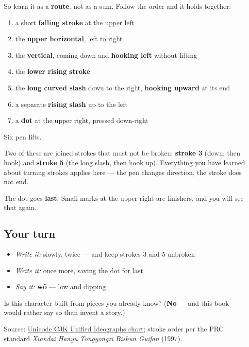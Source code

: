 So learn it as a \textbf{route}, not as a sum. Follow the order and it holds together:

\begin{enumerate}
\raggedright
  \item a short \textbf{falling stroke} at the upper left
  \item the \textbf{upper horizontal}, left to right
  \item the \textbf{vertical}, coming down and \textbf{hooking left} without lifting
  \item the \textbf{lower rising stroke}
  \item the \textbf{long curved slash} down to the right, \textbf{hooking upward} at its end
  \item a separate \textbf{rising slash} up to the left
  \item a \textbf{dot} at the upper right, pressed down-right
\end{enumerate}

Six pen lifts.

Two of these are joined strokes that must not be broken: \textbf{stroke 3} (down, then hook) and \textbf{stroke 5} (the long slash, then hook up). Everything you have learned about turning strokes applies here — the pen changes direction, the stroke does not end.

The dot goes \textbf{last}. Small marks at the upper right are finishers, and you will see that again.

\subsection*{Your turn}
\begin{itemize}
\raggedright
  \item \emph{Write it:}  slowly, twice — and keep strokes 3 and 5 unbroken
  \item \emph{Write it:}  once more, saving the dot for last
  \item \emph{Say it:} \textbf{wǒ} — low and dipping
\end{itemize}

\begin{tcolorbox}[breakable,colback=teal!4,colframe=teal!35!black,title={Before you move on}]
Is this character built from pieces you already know? (\textbf{No} — and this book would rather say so than invent a story.)

Source: \href{https://www.unicode.org/charts/PDF/U4E00.pdf}{Unicode CJK Unified Ideographs chart}; stroke order per the PRC standard \emph{Xiandai Hanyu Tongyongzi Bishun Guifan} (1997).
\end{tcolorbox}
